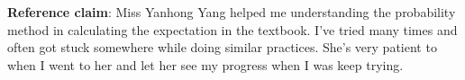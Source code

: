 \documentclass{article}
\begin{document}
\vfill 

\textbf{Reference claim}: Miss Yanhong Yang helped me understanding the probability method in calculating the expectation in the textbook. I've tried many times and often got stuck somewhere while doing similar practices. She's very patient to when I went to her and let her see my progress when I was keep trying. 


\end{document}
